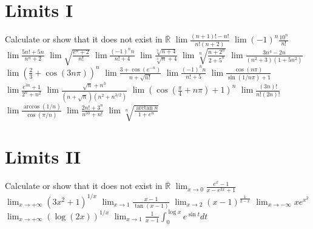 \documentclass[12pt]{article}
\begin{document}
\section{Limits I}
\begin{ExerciseList}
	\Exercise Calculate or show that it does not exist in $\overline{\mathbb R}$
	\Question $\lim \frac{(n+1)!-n!}{n!(n+2)}$
	\Question $\lim (-1)^n \frac{10^n}{n!}$
	\Question $\lim \frac{5n!+5n}{n^n + 2}$
	\Question $\lim \sqrt{\frac{e^n+2}{n!}}$
	\Question $\lim \frac{(-1)^n n}{n!+4}$
	\Question $\lim \frac{\sqrt[3]{n+4}}{\sqrt[3]{n}+4}$
	\Question $\lim \sqrt[n]{\frac{n+2^n}{2+5^n}}$
	\Question $\lim \frac{3n^4-2n}{(n^2 + 3)(1+5n^2)}$
	\Question $\lim (\frac{2}{3}+\cos(3n\pi))^n$
	\Question $\lim \frac{3+\cos(e^{-n})}{n+\sqrt{n!}}$
	\Question $\lim \frac{(-1)^n n }{n! + 5}$
	\Question $\lim \frac{\cos{(n\pi)}}{\sin{(1/n\pi)}+1}$
	\Question $\lim \frac{e^{3n}+1}{2^n+n^2}$
	\Question $\lim \frac{\sqrt{n} + n^3}{(n+\sqrt{n})(n^2 + n^{3/2})}$
	\Question $\lim (\cos{(\frac{\pi}{4}+n\pi)}+1)^n$
	\Question $\lim \frac{(3n)!}{n!(2n)!}$
	\Question $\lim \frac{\arccos(1/n)}{\cos(\pi/n)}$
	\Question $\lim \frac{2n! + 3^n}{n^{50} + n!}$
	\Question $\lim \sqrt[n]{\frac{\arctan n}{1+e^n}}$
\end{ExerciseList}

\section{Limits II}
\begin{ExerciseList}
	\Exercise Calculate or show that it does not exist in $\overline{\mathbb R}$
	\Question $\lim_{x\to 0}\frac{e^x - 1}{x-e^{3x} + 1}$
	\Question $\lim_{x\to +\infty}(3x^2+1)^{1/x}$
	\Question $\lim_{x\to 1}\frac{x-1}{\tan(x-1)}$
	\Question $\lim_{x\to 2}(x-1)^{\frac{1}{2-x}}$
	\Question $\lim_{x\to -\infty}xe^{x^2}$
	\Question $\lim_{x\to +\infty}(\log(2x))^{1/x}$
	\Question $\lim_{x\to 1}\frac{1}{x-1}\int_0^{\log x}{e^{\sin t}}dt$
\end{ExerciseList}
\end{document}

